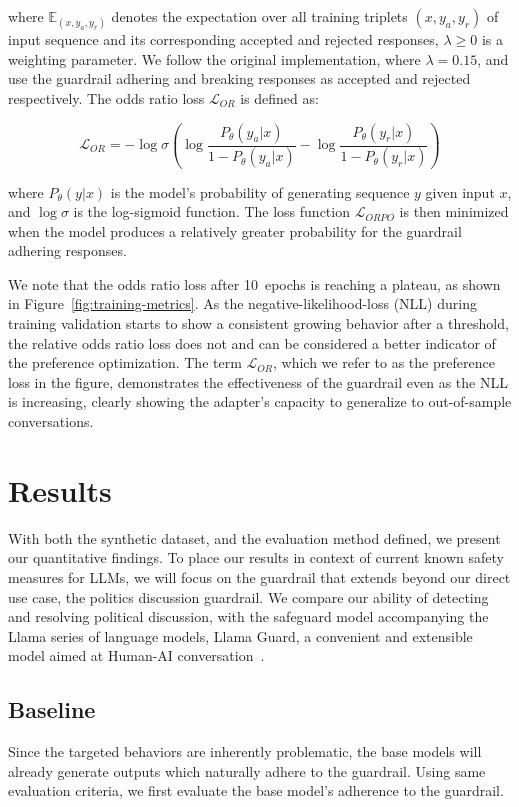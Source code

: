 \documentclass[letterpaper]{article}
\newcommand{\finetuningEpochsDefault}{10}
\newcommand{\oddsWeight}{0.1}
\begin{document}
where $\mathbb{E}_{(x,y_a,y_r)}$ denotes the expectation over all training triplets $(x,y_a,y_r)$ of input sequence and its corresponding accepted and rejected responses, $\lambda \ge 0$ is a weighting parameter. We follow the original implementation, where $\lambda = \oddsWeight5$, and use the guardrail adhering and breaking responses as accepted and rejected respectively.  
The odds ratio loss $\mathcal{L}_{OR}$ is defined as:

\begin{equation}
	\mathcal{L}_{OR} = -\log \sigma \left(\log \frac{P_\theta(y_a|x)}{1 - P_\theta(y_a|x)} - \log \frac{P_\theta(y_r|x)}{1 - P_\theta(y_r|x)}\right)
\end{equation}

where $P_\theta(y|x)$ is the model's probability of generating sequence $y$ given input $x$, and $\log \sigma$ is the log-sigmoid function. The loss function $\mathcal{L}_{ORPO}$ is then minimized when the model produces a relatively greater probability for the guardrail adhering responses. 

We note that the odds ratio loss after \finetuningEpochsDefault~epochs is reaching a plateau, as shown in Figure~\ref{fig:training-metrics}. As the negative-likelihood-loss (NLL) during training validation starts to show a consistent growing behavior after a threshold, the relative odds ratio loss does not and can be considered a better indicator of the preference optimization.  
The term $\mathcal{L}_{OR}$, which we refer to as the preference loss in the figure, demonstrates the effectiveness of the guardrail even as the NLL is increasing, clearly showing the adapter's capacity to generalize to out-of-sample conversations.

\section{Results}
With both the synthetic dataset, and the evaluation method defined, we present our quantitative findings. 
To place our results in context of current known safety measures for LLMs, we will focus on the guardrail that extends beyond our direct use case, the politics discussion guardrail. We compare our ability of detecting and resolving political discussion, with the safeguard model accompanying the Llama series of language models, Llama Guard, a convenient and extensible model aimed at Human-AI conversation~\cite{inan2023llama}.

\subsection{\label{sec:citeref}Baseline}
Since the targeted behaviors are inherently problematic, the base models will already generate outputs which naturally adhere to the guardrail. Using same evaluation criteria, we first evaluate the base model's adherence to the guardrail.
\end{document}
